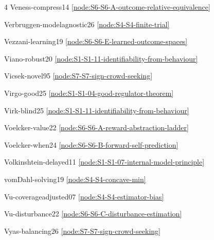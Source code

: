 \documentclass[10pt]{article}
\begin{document}
{\begin{multicols}{4}
Veness-compress14 \hfill \ref{node:S6-S6-A-outcome-relative-equivalence}\par
Verbruggen-modelagnostic26 \hfill \ref{node:S4-S4-finite-trial}\par
Vezzani-learning19 \hfill \ref{node:S6-S6-E-learned-outcome-spaces}\par
Viano-robust20 \hfill \ref{node:S1-S1-11-identifiability-from-behaviour}\par
Vicsek-novel95 \hfill \ref{node:S7-S7-sign-crowd-seeking}\par
Virgo-good25 \hfill \ref{node:S1-S1-04-good-regulator-theorem}\par
Virk-blind25 \hfill \ref{node:S1-S1-11-identifiability-from-behaviour}\par
Voelcker-value22 \hfill \ref{node:S6-S6-A-reward-abstraction-ladder}\par
Voelcker-when24 \hfill \ref{node:S6-S6-B-forward-self-prediction}\par
Volkinshtein-delayed11 \hfill \ref{node:S1-S1-07-internal-model-principle}\par
vomDahl-solving19 \hfill \ref{node:S4-S4-concave-min}\par
Vu-coverageadjusted07 \hfill \ref{node:S4-S4-estimator-bias}\par
Vu-disturbance22 \hfill \ref{node:S6-S6-C-disturbance-estimation}\par
Vyas-balancing26 \hfill \ref{node:S7-S7-sign-crowd-seeking}\par


\end{multicols}}
\end{document}
